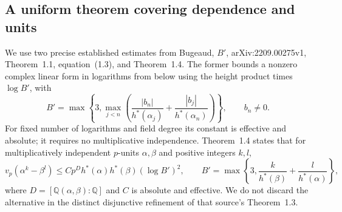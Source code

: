 \subsection{A uniform theorem covering dependence and units}
We use two precise established estimates from Bugeaud, \emph{$B'$},
arXiv:2209.00275v1, Theorem~1.1, equation~(1.3), and Theorem~1.4.
The former bounds a nonzero complex linear form in logarithms from below
using the height product times $\log B'$, with
\[
 B'=\max\left\{3,\max_{j<n}
 \left(\frac{|b_n|}{h^*(\alpha_j)}+
       \frac{|b_j|}{h^*(\alpha_n)}\right)\right\},\qquad b_n\ne0.
\]
For fixed number of logarithms and field degree its constant is effective
and absolute; it requires no multiplicative independence. Theorem~1.4
states that for multiplicatively independent $p$-units $\alpha,\beta$
and positive integers $k,l$,
\begin{equation}\label{lr-source-padic}
 v_p(\alpha^k-\beta^l)
 \le C p^D h^*(\alpha)h^*(\beta)(\log B')^2,\qquad
 B'=\max\left\{3,\frac{k}{h^*(\beta)}+
                       \frac{l}{h^*(\alpha)}\right\},
\end{equation}
where $D=[\mathbb Q(\alpha,\beta):\mathbb Q]$ and $C$ is absolute and
effective. We do not discard the alternative in the distinct disjunctive
refinement of that source's Theorem~1.3.

